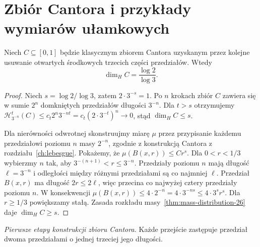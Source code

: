 \section{Zbiór Cantora i przykłady wymiarów ułamkowych}
\begin{twierdzenie}
\label{thm:cantor-dimension-26}
Niech $C\subseteq[0,1]$ będzie klasycznym zbiorem
Cantora uzyskanym przez kolejne usuwanie otwartych
środkowych trzecich części przedziałów. Wtedy
\[
 \dim_HC=\frac{\log2}{\log3}.
\]
\end{twierdzenie}
\begin{proof}
Niech $s=\log2/\log3$, zatem $2\cdot3^{-s}=1$.
Po $n$ krokach zbiór $C$ zawiera się w sumie
$2^n$ domkniętych przedziałów długości $3^{-n}$.
Dla $t>s$ otrzymujemy
$\mathcal H^t_{3^{-n}}(C)\le
c_t2^n3^{-nt}=c_t(2\cdot3^{-t})^n\to0$,
stąd $\dim_HC\le s$.

Dla nierówności odwrotnej skonstruujmy miarę
$\mu$ przez przypisanie każdemu przedziałowi
poziomu $n$ masy $2^{-n}$, zgodnie z konstrukcją
Cantora z rozdziału~\ref{ch:lebesgue}.
Pokażemy, że $\mu(B(x,r))\le Cr^s$.
Dla $0<r<1/3$ wybierzmy $n$ tak, aby
$3^{-(n+1)}<r\le3^{-n}$. Przedziały poziomu $n$
mają długość $\ell=3^{-n}$ i odległości między
różnymi przedziałami są co najmniej $\ell$.
Przedział $B(x,r)$ ma długość $2r\le2\ell$,
więc przecina co najwyżej cztery przedziały poziomu
$n$. W konsekwencji
$\mu(B(x,r))\le4\cdot2^{-n}
=4\cdot3^{-ns}\le4\cdot3^sr^s$.
Dla $r\ge1/3$ powiększamy stałą.
Zasada rozkładu masy~\ref{thm:mass-distribution-26}
daje $\dim_HC\ge s$.
\end{proof}

\begin{center}
\end{center}
\noindent\textit{Pierwsze etapy konstrukcji zbioru Cantora.}
Każde przejście zastępuje przedział dwoma
przedziałami o jednej trzeciej jego długości.

